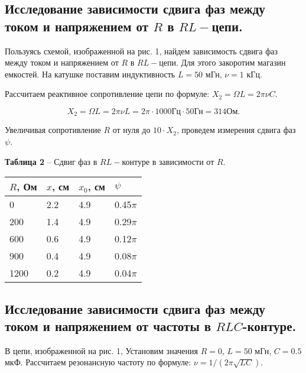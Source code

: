 \documentclass[12pt,a4paper]{article}
\begin{document}
    \subsection{Исследование зависимости сдвига фаз между током и напряжением от $R$ в $RL-$цепи.}
        Пользуясь схемой, изображенной на рис. 1, найдем зависимость сдвига фаз между током и напряжением от $R$ в $RL-$цепи. Для этого закоротим магазин емкостей. На катушке поставим индуктивность $L = 50$ мГн, $\nu = 1$ кГц.
        
        Рассчитаем реактивное сопротивление цепи по формуле: $X_2 = \Omega L = 2 \pi \nu C$. 
        
        \[
        X_2 = \Omega L = 2 \pi \nu L = 2 \pi \cdot 1000 \text{Гц}\cdot 50\text{Гн} = 314 \text{Ом}.
        \]
        
        Увеличивая сопротивление $R$ от нуля до $10 \cdot X_2$, проведем измерения сдвига фаз $\psi$.
        
        \begin{table}[!h]
        \begin{flushleft}
       		\hspace{80}\textbf{Таблица 2} -- Сдвиг фаз в $RL-$контуре в зависимости от  $R$.\\
        \end{flushleft}
            \begin{center}
                \begin{tabular}{ | l | l | l | l |}
                    \hline
                    $R$, Ом &   $x$, см &  $x_0$, см&   $\psi$      \\
                    \hline
                    0       &   2.2     &   4.9     &   0.45$\pi$   \\
                    200     &   1.4     &   4.9     &   0.29$\pi$   \\
                    600     &   0.6     &   4.9     &   0.12$\pi$   \\
                    900     &   0.4     &   4.9     &   0.08$\pi$  \\
                    1200    &   0.2     &   4.9     &   0.04$\pi$  \\
                    \hline                
                \end{tabular}
            \end{center}
        \end{table}
        
    \subsection{Исследование зависимости сдвига фаз между током и напряжением от частоты в $RLC$-контуре.}
        В цепи, изображенной на рис. 1, Установим значения $R = 0$, $L = 50$ мГн, $C = 0.5$ мкФ. Рассчитаем резонансную частоту по формуле: $\nu = 1/(2 \pi \sqrt{LC})$.
        
\end{document}
